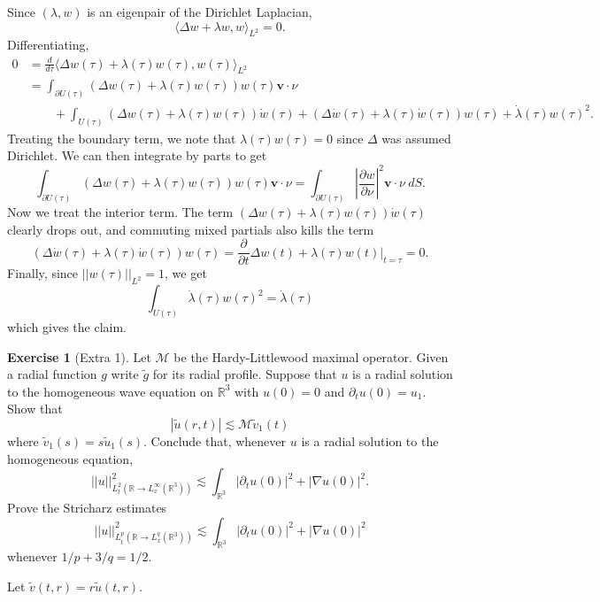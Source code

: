 \documentclass[10pt]{article}
\newcommand{\RR}{\mathbb{R}}
\theoremstyle{definition}
\newtheorem{exer}{Exercise}
\begin{document}
Since $(\lambda, w)$ is an eigenpair of the Dirichlet Laplacian,
$$\langle \Delta w + \lambda w, w\rangle_{L^2} = 0.$$
Differentiating,
\begin{align*}0 &= \frac{d}{d\tau} \langle \Delta w(\tau) + \lambda(\tau) w(\tau), w(\tau)\rangle_{L^2}\\
& = \int_{\partial U(\tau)} (\Delta w(\tau) +\lambda(\tau) w(\tau))w(\tau) \mathbf v\cdot \nu \\
&\qquad+ \int_{U(\tau)} (\Delta w(\tau) + \lambda(\tau)w(\tau)) \dot w(\tau) + (\Delta \dot w(\tau) + \lambda(\tau) \dot w(\tau))w(\tau) + \dot \lambda(\tau)w(\tau)^2.
\end{align*}
Treating the boundary term, we note that $\lambda(\tau) w(\tau) = 0$ since $\Delta$ was assumed Dirichlet. We can then integrate by parts to get
$$\int_{\partial U(\tau)} (\Delta w(\tau) +\lambda(\tau) w(\tau))w(\tau) \mathbf v\cdot \nu = \int_{\partial U(\tau)} \left|\frac{\partial w}{\partial \nu}\right|^2 \mathbf v\cdot \nu~dS.$$
Now we treat the interior term.
The term $(\Delta w(\tau) + \lambda(\tau)w(\tau)) \dot w(\tau)$ clearly drops out, and commuting mixed partials also kills the term
$$(\Delta \dot w(\tau) + \lambda(\tau) \dot w(\tau))w(\tau) = \frac{\partial}{\partial t} \Delta w(t) + \lambda(\tau) w(t) \bigg|_{t = \tau} = 0.$$
Finally, since $||w(\tau)||_{L^2} = 1$, we get
$$\int_{U(\tau)}\dot \lambda(\tau)w(\tau)^2 = \dot \lambda(\tau)$$
which gives the claim.

\begin{exer}[Extra 1]
Let $\mathcal M$ be the Hardy-Littlewood maximal operator. Given a radial function $g$ write $\tilde g$ for its radial profile.
Suppose that $u$ is a radial solution to the homogeneous wave equation on $\RR^3$ with $u(0) = 0$ and $\partial_t u(0) = u_1$. Show that
$$|\tilde u(r, t)| \lesssim \mathcal M \tilde v_1(t)$$
where $\tilde v_1(s) = s\tilde u_1(s)$.
Conclude that, whenever $u$ is a radial solution to the homogeneous equation,
$$||u||_{L^2_t(\RR \to L^\infty_x(\RR^3))}^2 \lesssim \int_{\RR^3} |\partial_t u(0)|^2 + |\nabla u(0)|^2.$$
Prove the Stricharz estimates
$$||u||_{L^p_t(\RR \to L^q_x(\RR^3))}^2 \lesssim \int_{\RR^3} |\partial_t u(0)|^2 + |\nabla u(0)|^2$$
whenever $1/p + 3/q = 1/2$.
\end{exer}

Let $\tilde v(t, r) = r \tilde u(t, r)$.
\end{document}
